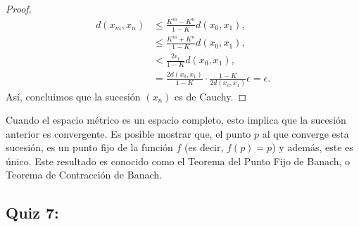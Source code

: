 \begin{itemize}[leftmargin=*]
\begin{proof}
      \begin{align*}
          d(x_m,x_n)&\leq\frac{K^m-K^n}{1-K}d(x_0,x_1),\\
          &\leq \frac{K^m+K^n}{1-K}d(x_0,x_1),\\
          &< \frac{2\epsilon_1}{1-K}d(x_0,x_1),\\
          &=\frac{2d(x_0,x_1)}{1-K}\cdot \frac{1-K}{2d(x_0,x_1)}\epsilon =\epsilon.
      \end{align*}
      Así, concluimos que la sucesión $(x_n)$ es de Cauchy.
    \end{proof}
    \begin{note}
        Cuando el espacio métrico es un espacio completo, esto implica que la sucesión anterior es convergente. Es posible mostrar que, el punto $p$ al que converge esta sucesión, es un punto fijo de la función $f$ (es decir, $f(p)=p$) y además, este es único. Este resultado es conocido como el Teorema del Punto Fijo de Banach, o Teorema de Contracción de Banach.
    \end{note}
\end{itemize}



\subsection{Quiz 7:}

